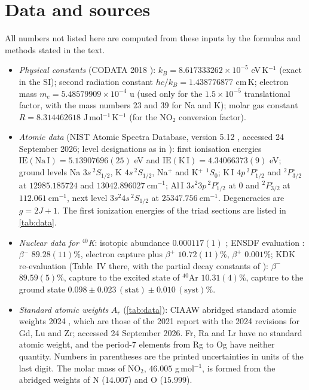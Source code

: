 \documentclass[11pt]{article}
\theoremstyle{definition}\newtheorem{definition}[theorem]{Definition}
\theoremstyle{remark}\newtheorem{remark}[theorem]{Remark}
\begin{document}
\section{Data and sources}\label{sec:data}
All numbers not listed here are computed from these inputs by the formulas and methods stated in the text.
\begin{itemize}
\item \emph{Physical constants} (CODATA 2018 \cite{CODATA}): $k_B=8.617333262\times10^{-5}$ eV\,K$^{-1}$ (exact in the SI); second radiation constant $hc/k_B=1.438776877$ cm\,K; electron mass $m_e=5.48579909\times10^{-4}$ u (used only for the $1.5\times10^{-5}$ translational factor, with the mass numbers $23$ and $39$ for Na and K); molar gas constant $R=8.314462618$ J\,mol$^{-1}$\,K$^{-1}$ (for the NO$_2$ conversion factor).
\item \emph{Atomic data} (NIST Atomic Spectra Database, version 5.12 \cite{NIST}, accessed 24 September 2026; level designations as in \cite{SansonettiMartin}): first ionisation energies $\mathrm{IE(Na\,I)}=5.13907696(25)$ eV and $\mathrm{IE(K\,I)}=4.34066373(9)$ eV; ground levels Na $3s\,{}^2S_{1/2}$, K $4s\,{}^2S_{1/2}$, Na$^+$ and K$^+$ ${}^1S_0$; K\,I $4p\,{}^2P^\circ_{1/2}$ and ${}^2P^\circ_{3/2}$ at $12985.185724$ and $13042.896027\ \mathrm{cm^{-1}}$; Al\,I $3s^{2}3p\,{}^2P^\circ_{1/2}$ at $0$ and ${}^2P^\circ_{3/2}$ at $112.061\ \mathrm{cm^{-1}}$, next level $3s^{2}4s\,{}^2S_{1/2}$ at $25347.756\ \mathrm{cm^{-1}}$. Degeneracies are $g=2J+1$. The first ionization energies of the triad sections are listed in \cref{tab:data}.
\item \emph{Nuclear data for ${}^{40}$K}: isotopic abundance $0.000117(1)$ \cite{Meija}; ENSDF evaluation \cite{Chen}: $\beta^-$ $89.28(11)\%$, electron capture plus $\beta^+$ $10.72(11)\%$, $\beta^+$ $0.001\%$; KDK re-evaluation \cite{KDK} (Table~IV there, with the partial decay constants of \cite{Kossert}): $\beta^-$ $89.59(5)\%$, capture to the excited state of ${}^{40}$Ar $10.31(4)\%$, capture to the ground state $0.098\pm0.023\,(\text{stat})\pm0.010\,(\text{syst})\%$.
\item \emph{Standard atomic weights} $A_r$ (\cref{tab:data}): CIAAW abridged standard atomic weights 2024 \cite{CIAAW}, which are those of the 2021 report \cite{Prohaska2022} with the 2024 revisions for Gd, Lu and Zr; accessed 24 September 2026. Fr, Ra and Lr have no standard atomic weight, and the period-7 elements from Rg to Og have neither quantity. Numbers in parentheses are the printed uncertainties in units of the last digit. The molar mass of NO$_2$, $46.005$ g\,mol$^{-1}$, is formed from the abridged weights of N ($14.007$) and O ($15.999$).

\end{itemize}
\end{document}

